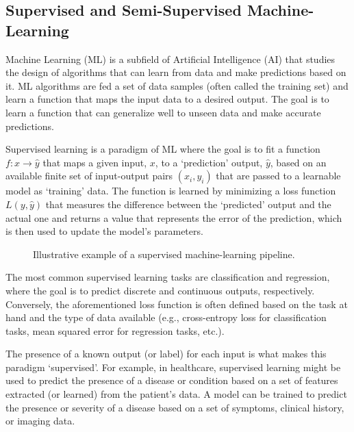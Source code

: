\documentclass[../main.tex]{subfiles}
\begin{document}
    \subsection{Supervised and Semi-Supervised Machine-Learning} \label{sec:supervised_ml}

    Machine Learning (ML) is a subfield of Artificial Intelligence (AI) that studies the design of algorithms that can learn from data and make predictions based on it. ML algorithms are fed a set of data samples (often called the training set) and learn a function that maps the input data to a desired output. The goal is to learn a function that can generalize well to unseen data and make accurate predictions. 


    Supervised learning is a paradigm of ML where the goal is to fit a function $f: x \rightarrow \hat{y}$ that maps a given input, $x$, to a `prediction' output, $\hat{y}$, based on an available finite set of input-output pairs $(x_i, y_i)$ that are passed to a learnable model as `training' data. The function is learned by minimizing a loss function $L(y, \hat{y})$ that measures the difference between the `predicted' output and the actual one and returns a value that represents the error of the prediction, which is then used to update the model's parameters.
    
    \begin{figure}[h]
        \centering
        \resizebox*{0.9\columnwidth}{!}{
            
        }
        \caption{Illustrative example of a supervised machine-learning pipeline.}
        \label{fig:supervised_learning}
    \end{figure}


    The most common supervised learning tasks are classification and regression, where the goal is to predict discrete and continuous outputs, respectively. Conversely, the aforementioned loss function is often defined based on the task at hand and the type of data available (e.g., cross-entropy loss for classification tasks, mean squared error for regression tasks, etc.).

    The presence of a known output (or label) for each input is what makes this paradigm `supervised'. For example, in healthcare, supervised learning might be used to predict the presence of a disease or condition based on a set of features extracted (or learned) from the patient's data. A model can be trained to predict the presence or severity of a disease based on a set of symptoms, clinical history, or imaging data.
\end{document}
